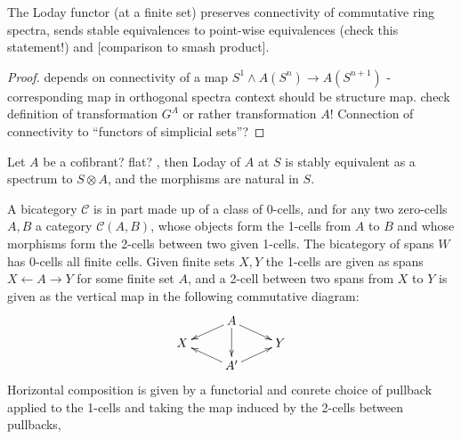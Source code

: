     \begin{lem}\label{lem_loday_functor_preserves_connectivity}
      The Loday functor (at a finite set) preserves connectivity of commutative ring spectra, sends stable equivalences to point-wise equivalences (check this statement!) and [comparison to smash product].
      \begin{proof}
        depends on connectivity of a map $S^1 \wedge A(S^n) \to A(S^{n+1})$ - corresponding map in orthogonal spectra context should be structure map. check definition of transformation $G^A$ or rather transformation $A$! Connection of connectivity to ``functors of simplicial sets''?
      \end{proof}
    \end{lem}

    \begin{cor}\label{cor_loday_at_S_naturally_equivalent_to_tensor_with_S}
      Let $A$ be a cofibrant? flat? \hring, then Loday of $A$ at $S$ is stably equivalent as a spectrum to $S \otimes A$, and the morphisms are natural in $S$.
    \end{cor}


    A bicategory $\mathcal{C}$ is in part made up of a class of 0-cells, and for any two zero-cells $A,B$ a category $\mathcal{C}(A,B)$, whose objects form the 1-cells from $A$ to $B$ and whose morphisms form the 2-cells between two given 1-cells. The bicategory of spans $W$ has 0-cells all finite cells. Given finite sets $X,Y$ the 1-cells are given as spans $ X \leftarrow A \rightarrow Y$ for some finite set $A$, and a 2-cell between two spans from $X$ to $Y$  is given as the vertical map in the following commutative diagram:
    \[
    \xymatrix@R-=.5em{
      &
      A \ar[dl] \ar[dd] \ar[dr]
      \\
      X
      &
      &
      Y
      \\
      &
      A^\prime \ar[ul] \ar[ur]
      &
    }
    \]
    Horizontal composition is given by a functorial and conrete choice of pullback applied to the 1-cells and taking the map induced by the 2-cells between pullbacks,


